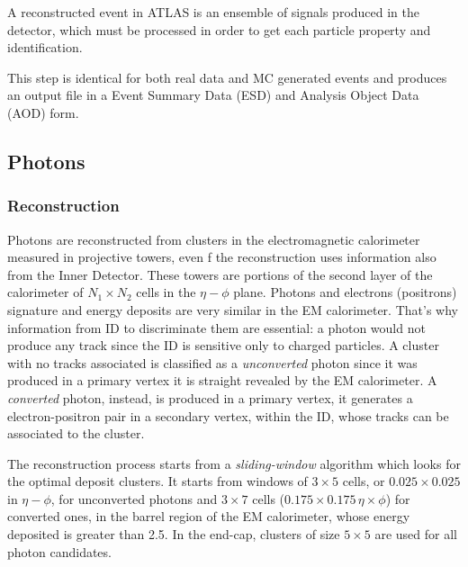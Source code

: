 A reconstructed event in ATLAS is an ensemble of signals produced in the detector, which must be processed in order to get each particle property and identification. 

This step is identical for both real data and MC generated events and produces an output file in a Event Summary Data (ESD) and Analysis Object Data (AOD) form. 

\subsection{Photons}
\label{photons}
\subsubsection{Reconstruction}
Photons are reconstructed from clusters in the electromagnetic calorimeter measured in projective towers, even f the reconstruction uses information also from the Inner Detector. These towers are portions of the second layer of the calorimeter of $N_1 \times N_2$ cells in the $\eta-\phi$ plane. Photons and electrons (positrons) signature and energy deposits are very similar in the EM calorimeter. That's why information from ID to discriminate them are essential: a photon would not produce any track since the ID is sensitive only to charged particles. A cluster with no tracks associated is classified as a \emph{unconverted} photon since it was produced in a primary vertex it is straight revealed by the EM calorimeter. A \emph{converted} photon, instead, is produced in a primary vertex, it generates a electron-positron pair in a secondary vertex, within the ID, whose tracks can be associated to the cluster.

The reconstruction process starts from a \emph{sliding-window} algorithm which looks for the optimal deposit clusters. It starts from windows of $3\times5$ cells, or $0.025\times0.025$ in $\eta-\phi$, for unconverted photons and $3\times7$ cells ($0.175\times0.175 \, \eta\times\phi$) for converted ones, in the barrel region of the EM calorimeter, whose energy deposited is greater than \SI{2.5}{\gev}. In the end-cap, clusters of size $5\times5$ are used for all photon candidates.


